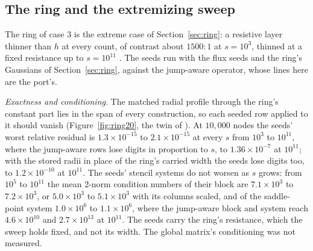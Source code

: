 \documentclass[11pt]{amsart}
\theoremstyle{definition}
\theoremstyle{remark}
\newcommand{\para}[1]{\par\smallskip\noindent\textit{#1}.\enspace}
\newcommand{\sci}[2]{#1 \times 10^{#2}}
\begin{document}
\subsection{The ring and the extremizing sweep}
\label{sec:ring2d}
The ring of case 3 is the extreme case of Section~\ref{sec:ring}: a
resistive layer thinner than $h$ at every count, of contrast about
$1500 : 1$ at $s = 10^3$, thinned at a fixed resistance up to $s = 10^{11}$
\cite{MartinFornberg2017heat}. The seeds run with the flux seeds and the
ring's Gaussians of Section~\ref{sec:ring}, against the jump-aware operator,
whose lines here are the port's.

\para{Exactness and conditioning}
The matched radial profile through the ring's constant part lies in the span
of every construction, so each seeded row applied to it should vanish
(Figure~\ref{fig:ring20}, the twin of
\cite[Fig.~20]{MartinFornberg2017heat}). At $10{,}000$ nodes the seeds' worst
relative residual is $\sci{1.3}{-15}$ to $\sci{2.1}{-15}$ at every $s$ from
$10^3$ to $10^{11}$, where the jump-aware rows lose digits in proportion to
$s$, to $\sci{1.36}{-7}$ at $10^{11}$; with the stored radii in place of the
ring's carried width the seeds lose digits too, to $\sci{1.2}{-10}$ at
$10^{11}$. The seeds' stencil systems do not worsen as $s$ grows: from
$10^5$ to $10^{11}$ the mean 2-norm condition numbers of their block are
$\sci{7.1}{3}$ to $\sci{7.2}{3}$, or $\sci{5.0}{3}$ to $\sci{5.1}{3}$ with
its columns scaled, and of the saddle-point system $\sci{1.0}{6}$ to
$\sci{1.1}{6}$, where the jump-aware block and system reach $\sci{4.6}{10}$
and $\sci{2.7}{13}$ at $10^{11}$. The seeds carry the ring's resistance,
which the sweep holds fixed, and not its width. The global matrix's
conditioning was not measured.
\end{document}
